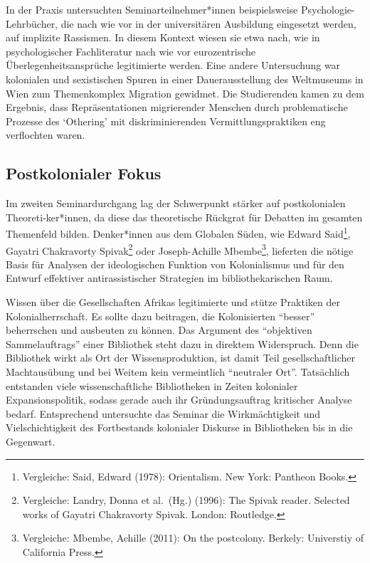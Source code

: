 \documentclass[a4paper,
fontsize=11pt,
oneside,
numbers=noperiodatend,
parskip=half-,
bibliography=totoc,
final
]{scrartcl}
\begin{document}
In der Praxis untersuchten Seminarteilnehmer*innen beispielsweise
Psychologie-Lehrbücher, die nach wie vor in der universitären Ausbildung
eingesetzt werden, auf implizite Rassismen. In diesem Kontext wiesen sie
etwa nach, wie in psychologischer Fachliteratur nach wie vor
eurozentrische Überlegenheitsansprüche legitimierte werden. Eine andere
Untersuchung war kolonialen und sexistischen Spuren in einer
Dauerausstellung des Weltmuseums in Wien zum Themenkomplex Migration
gewidmet. Die Studierenden kamen zu dem Ergebnis, dass Repräsentationen
migrierender Menschen durch problematische Prozesse des
\enquote*{Othering} mit diskriminierenden Vermittlungspraktiken eng
verflochten waren.

\hypertarget{postkolonialer-fokus}{%
\subsection{Postkolonialer Fokus}\label{postkolonialer-fokus}}

Im zweiten Seminardurchgang lag der Schwerpunkt stärker auf
postkolonialen Theoreti-\linebreak ker*innen, da diese das theoretische Rückgrat für
Debatten im gesamten Themenfeld bilden. Denker*innen aus dem Globalen
Süden, wie Edward Said\footnote{Vergleiche: Said, Edward (1978):
  Orientalism. New York: Pantheon Books.}, Gayatri Chakravorty
Spivak\footnote{Vergleiche: Landry, Donna et al.~(Hg.) (1996): The
  Spivak reader. Selected works of Gayatri Chakravorty Spivak. London:
  Routledge.} oder Joseph-Achille Mbembe\footnote{Vergleiche: Mbembe,
  Achille (2011): On the postcolony. Berkely: Universtiy of California
  Press.}, lieferten die nötige Basis für Analysen der ideologischen
Funktion von Kolonialismus und für den Entwurf effektiver
antirassistischer Strategien im bibliothekarischen Raum.

Wissen über die Gesellschaften Afrikas legitimierte und stütze Praktiken
der Kolonialherrschaft. Es sollte dazu beitragen, die Kolonisierten
\enquote{besser} beherrschen und ausbeuten zu können. Das Argument des
\enquote{objektiven Sammelauftrags} einer Bibliothek steht dazu in
direktem Widerspruch. Denn die Bibliothek wirkt als Ort der
Wissensproduktion, ist damit Teil gesellschaftlicher Machtausübung und
bei Weitem kein vermeintlich \enquote{neutraler Ort}. Tatsächlich
entstanden viele wissenschaftliche Bibliotheken in Zeiten kolonialer
Expansionspolitik, sodass gerade auch ihr Gründungsauftrag kritischer
Analyse bedarf. Entsprechend untersuchte das Seminar die Wirkmächtigkeit
und Vielschichtigkeit des Fortbestands kolonialer Diskurse in
Bibliotheken bis in die Gegenwart.
\end{document}
